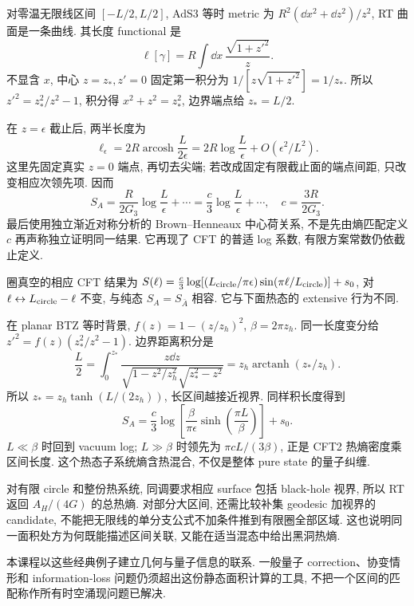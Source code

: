 对零温无限线区间 $[-L/2,L/2]$, AdS3 等时 metric 为 $R^2(\dd x^2+\dd z^2)/z^2$, RT 曲面是一条曲线. 其长度 functional 是
\[
\ell[\gamma]=R\int\dd x\,\frac{\sqrt{1+z'^2}}z.
\]
不显含 $x$, 中心 $z=z_*,z'=0$ 固定第一积分为 $1/[z\sqrt{1+z'^2}]=1/z_*$. 所以 $z'^2=z_*^2/z^2-1$, 积分得 $x^2+z^2=z_*^2$, 边界端点给 $z_*=L/2$.

在 $z=\epsilon$ 截止后, 两半长度为
\[
\ell_\epsilon=2R\operatorname{arcosh}\frac{L}{2\epsilon}
=2R\log\frac L\epsilon+O(\epsilon^2/L^2).
\]
这里先固定真实 $z=0$ 端点, 再切去尖端; 若改成固定有限截止面的端点间距, 只改变相应次领先项. 因而
\[
S_A=\frac R{2G_3}\log\frac L\epsilon+\cdots
=\frac c3\log\frac L\epsilon+\cdots,
\quad c=\frac{3R}{2G_3}.
\]
最后使用独立渐近对称分析的 Brown--Henneaux 中心荷关系, 不是先由熵匹配定义 $c$ 再声称独立证明同一结果. 它再现了 CFT 的普适 log 系数, 有限方案常数仍依截止定义.

圈真空的相应 CFT 结果为 $S(\ell)=\tfrac c3\log[(L_{\rm circle}/\pi\epsilon)\sin(\pi\ell/L_{\rm circle})]+s_0$, 对 $\ell\leftrightarrow L_{\rm circle}-\ell$ 不变, 与纯态 $S_A=S_{\bar A}$ 相容. 它与下面热态的 extensive 行为不同.

在 planar BTZ 等时背景, $f(z)=1-(z/z_h)^2$, $\beta=2\pi z_h$. 同一长度变分给 $z'^2=f(z)(z_*^2/z^2-1)$. 边界距离积分是
\[
\frac L2=\int_0^{z_*}\frac{z\dd z}
{\sqrt{1-z^2/z_h^2}\sqrt{z_*^2-z^2}}
=z_h\operatorname{arctanh}(z_*/z_h).
\]
所以 $z_*=z_h\tanh(L/(2z_h))$, 长区间越接近视界. 同样积长度得到
\[
S_A=\frac c3\log\left[
\frac\beta{\pi\epsilon}\sinh\left(\frac{\pi L}\beta\right)\right]+s_0.
\]
$L\ll\beta$ 时回到 vacuum log; $L\gg\beta$ 时领先为 $\pi cL/(3\beta)$, 正是 CFT2 热熵密度乘区间长度. 这个热态子系统熵含热混合, 不仅是整体 pure state 的量子纠缠.

对有限 circle 和整份热系统, 同调要求相应 surface 包括 black-hole 视界, 所以 RT 返回 $A_H/(4G)$ 的总热熵. 对部分大区间, 还需比较补集 geodesic 加视界的 candidate, 不能把无限线的单分支公式不加条件推到有限圈全部区域. 这也说明同一面积处方为何既能描述区间关联, 又能在适当混态中给出黑洞热熵.

本课程以这些经典例子建立几何与量子信息的联系. 一般量子 correction、协变情形和 information-loss 问题仍须超出这份静态面积计算的工具, 不把一个区间的匹配称作所有时空涌现问题已解决.
